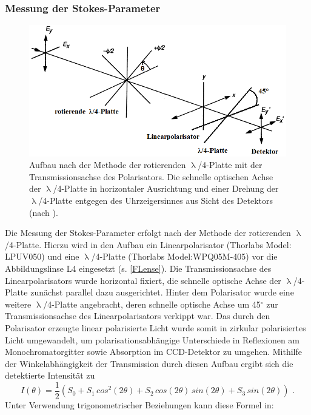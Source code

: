 \subsubsection{Messung der Stokes-Parameter}
\label{Mess.Stokes}
\begin{figure}[h]
\includegraphics[width=.8\textwidth]{Bilder/Methodik/stokesaufbau}
\caption{Aufbau nach der Methode der rotierenden $\uplambda$/4-Platte mit der Transmissionsachse des Polarisators. Die schnelle optischen Achse der $\uplambda$/4-Platte in horizontaler Ausrichtung und einer Drehung der $\uplambda$/4-Platte entgegen des Uhrzeigersinnes aus Sicht des Detektors (nach \cite{Goldstein.2003}).}
\end{figure}
\noindent Die Messung der Stokes-Parameter erfolgt nach der Methode der rotierenden $\uplambda$/4-Platte. Hierzu wird in den Aufbau ein Linearpolarisator (Thorlabs Model: LPUV050) und eine $\uplambda$/4-Platte (Thorlabs  Model:WPQ05M-405) vor die Abbildungslinse L4 eingesetzt (s. \autoref{FLense}). Die Transmissionsachse des Linearpolarisators wurde horizontal fixiert, die schnelle optische Achse der $\uplambda$/4-Platte zunächst parallel dazu ausgerichtet. Hinter dem Polarisator wurde eine weitere $\uplambda$/4-Platte angebracht, deren schnelle optische Achse um 45$^\circ$ zur Transmissionsachse des Linearpolarisators verkippt war. Das durch den Polarisator erzeugte linear polarisierte Licht wurde somit in zirkular polarisiertes Licht umgewandelt, um polarisationsabhängige Unterschiede in Reflexionen am Monochromatorgitter sowie Absorption im CCD-Detektor zu umgehen. Mithilfe der Winkelabhängigkeit der Transmission durch diesen Aufbau ergibt sich die detektierte Intensität zu
\begin{equation}
I(\theta)= \frac{1}{2} \left( S_0 + S_1 \, cos^2(2\theta) + S_2 \, cos(2\theta)\,sin(2\theta) + S_3 \, sin(2\theta) \right) \text{ .}
\label{StokesGleichung}
\end{equation}
Unter Verwendung trigonometrischer Beziehungen kann diese Formel in:
